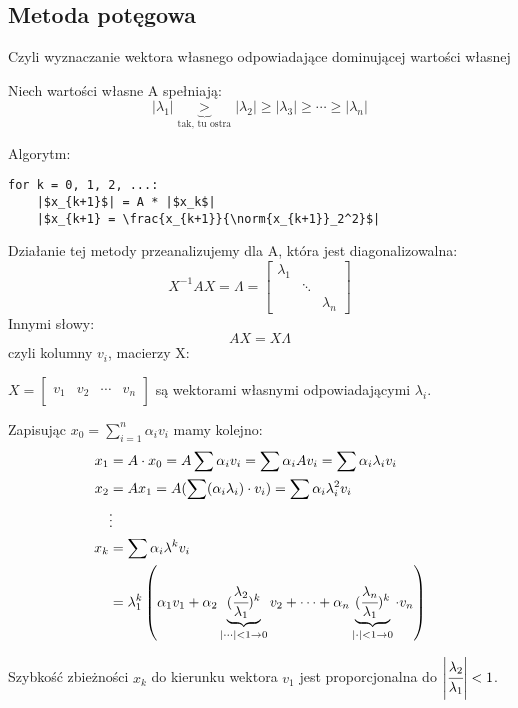 \documentclass[hidelinks,a4paper,fleqn,oneside]{book}
\newcommand{\RR}{\mathbb{R}}
\newcommand{\CC}{\mathbb{C}}
\newcommand{\ra}{\rightarrow}
\newcommand{\norm}[1]{\left\lVert#1\right\rVert}
\begin{document}
\subsection{Metoda potęgowa}
Czyli wyznaczanie wektora własnego odpowiadające dominującej wartości własnej

Niech wartości własne A spełniają:
\[
	|\lambda_1| \underbrace{>}_{\textrm{tak, tu ostra}} |\lambda_2| \geq |\lambda_3| \geq \cdots \geq |\lambda_n|
\]

Algorytm:
\begin{verbatim}
for k = 0, 1, 2, ...:
    |$x_{k+1}$| = A * |$x_k$|
    |$x_{k+1} = \frac{x_{k+1}}{\norm{x_{k+1}}_2^2}$|
\end{verbatim}
Działanie tej metody przeanalizujemy dla A, która jest diagonalizowalna:
\[
	X^{-1} A X = \Lambda = \begin{bmatrix} \lambda_1 &  & \\  &  \ddots & \\ &  & \lambda_n \end{bmatrix}
\]
Innymi słowy:
\[
	AX = X \Lambda
\]
czyli kolumny $v_i$, macierzy X:
 
$X = \left[ \begin{array}{c|c|c|c} &&& \\ v_1 & v_2 & \cdots & v_n \\ &&& \end{array} \right]$ są wektorami własnymi odpowiadającymi $\lambda_i$.
 
Zapisując $x_0 = \sum_{i=1}^{n} \alpha_i v_i$ mamy kolejno:
\begin{align*}
	x_1 & = A \cdot x_0 = A \sum \alpha_iv_i = \sum \alpha_i Av_i = \sum \alpha_i \lambda_i v_i \\
	x_2 & = Ax_1 = A(\sum(\alpha_i\lambda_i)\cdot v_i) = \sum \alpha_i \lambda_i^2 v_i \\
	& \vdots \\
	x_k & = \sum \alpha_i \lambda^k v_i \\ & = \lambda_1^k\left(\alpha_1 v_1 + \alpha_2\underbrace{(\cfrac{\lambda_2}{\lambda_1})^k}_{| \cdots | < 1 \ra 0} v_2 + \cdots + \alpha_n \underbrace{(\cfrac{\lambda_n}{\lambda_1})^k}_{| \cdot | < 1 \ra 0} \cdot v_n\right)
\end{align*}
 
Szybkość zbieżności $x_k$ do kierunku wektora $v_1$ jest proporcjonalna do $\left| \cfrac{\lambda_2}{\lambda_1} \right| < 1$.
 
%
\end{document}
